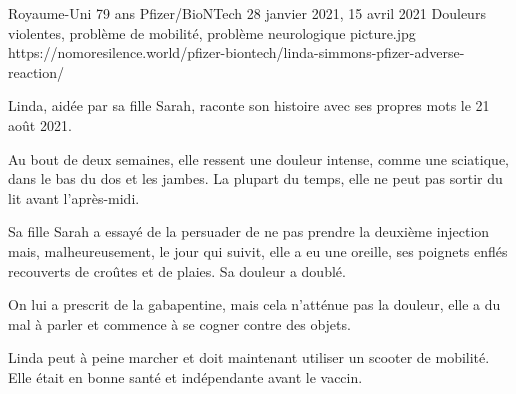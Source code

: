 {Royaume-Uni}
{79 ans}
{Pfizer/BioNTech}
{28 janvier 2021, 15 avril 2021}
{Douleurs violentes, problème de mobilité, problème neurologique}
{picture.jpg}
{https://nomoresilence.world/pfizer-biontech/linda-simmons-pfizer-adverse-reaction/}
{

Linda, aidée par sa fille Sarah, raconte son histoire avec ses propres mots le
21 août 2021.

Au bout de deux semaines, elle ressent une douleur intense, comme une sciatique,
dans le bas du dos et les jambes. La plupart du temps, elle ne peut pas sortir
du lit avant l'après-midi.

Sa fille Sarah a essayé de la persuader de ne pas prendre la deuxième injection
mais, malheureusement, le jour qui suivit, elle a eu une oreille, ses poignets
enflés recouverts de croûtes et de plaies. Sa douleur a doublé.

On lui a prescrit de la gabapentine, mais cela n'atténue pas la douleur, elle a
du mal à parler et commence à se cogner contre des objets.

Linda peut à peine marcher et doit maintenant utiliser un scooter de
mobilité. Elle était en bonne santé et indépendante avant le vaccin.

}
